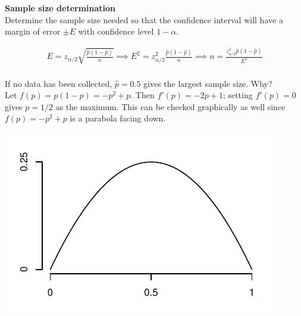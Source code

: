 \documentclass[fleqn, 11pt]{article}\usepackage[]{graphicx}\usepackage[]{color}
\begin{document}
\textbf{Sample size determination}\\
Determine the sample size needed so that the confidence interval will have a margin of error $\pm E$ with confidence level $1-\alpha$.
{\color{blue}
\begin{align*}
E = z_{\alpha/2} \sqrt{\frac{\hat{p}(1-\hat{p})}{n}}
\implies E^2 = z^2_{\alpha/2} \frac{\hat{p}(1-\hat{p})}{n} \implies n = \frac{z^2_{\alpha/2} \hat{p}(1-\hat{p})}{E^2}\\
\end{align*}

If no data has been collected, $\hat{p}=0.5$ gives the largest sample size.  Why?\\
Let $f(p) = p(1-p) = -p^2 + p$. Then $f'(p) = -2p + 1$; setting $f'(p)=0$ gives $p=1/2$ as the maximum.  This can be checked graphically as well since $f(p) = -p^2 + p$ is a parabola facing down.
}
\includegraphics[scale=0.65]{parabola.pdf}
\end{document}
